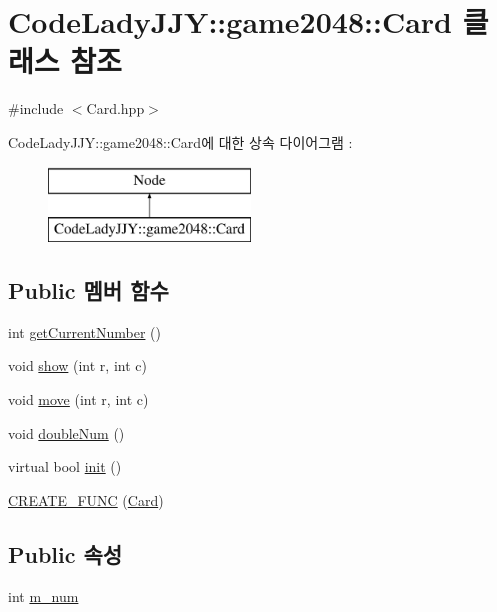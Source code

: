 \hypertarget{class_code_lady_j_j_y_1_1game2048_1_1_card}{}\section{Code\+Lady\+J\+JY\+:\+:game2048\+:\+:Card 클래스 참조}
\label{class_code_lady_j_j_y_1_1game2048_1_1_card}


{\ttfamily \#include $<$Card.\+hpp$>$}

Code\+Lady\+J\+JY\+:\+:game2048\+:\+:Card에 대한 상속 다이어그램 \+: \begin{figure}[H]
\begin{center}
\leavevmode
\includegraphics[height=2.000000cm]{class_code_lady_j_j_y_1_1game2048_1_1_card}
\end{center}
\end{figure}
\subsection*{Public 멤버 함수}
\begin{DoxyCompactItemize}
\item 
int \hyperlink{class_code_lady_j_j_y_1_1game2048_1_1_card_a7c8da9286db22bb16cfa0f8502b41eb4}{get\+Current\+Number} ()
\item 
void \hyperlink{class_code_lady_j_j_y_1_1game2048_1_1_card_abd3f3208867d1450ba4eeef3cef62d3f}{show} (int r, int c)
\item 
void \hyperlink{class_code_lady_j_j_y_1_1game2048_1_1_card_a6ad341b10626a9cc1aafe8229fa61ea6}{move} (int r, int c)
\item 
void \hyperlink{class_code_lady_j_j_y_1_1game2048_1_1_card_ad4cae75359815f3d80db488df3fd3dfd}{double\+Num} ()
\item 
virtual bool \hyperlink{class_code_lady_j_j_y_1_1game2048_1_1_card_a5efe85fbf1117b9a64cc13311352284c}{init} ()
\item 
\hyperlink{class_code_lady_j_j_y_1_1game2048_1_1_card_aeef08b192f5d93d6852ebfb75bb9bd9a}{C\+R\+E\+A\+T\+E\+\_\+\+F\+U\+NC} (\hyperlink{class_code_lady_j_j_y_1_1game2048_1_1_card}{Card})
\end{DoxyCompactItemize}
\subsection*{Public 속성}
\begin{DoxyCompactItemize}
\item 
int \hyperlink{class_code_lady_j_j_y_1_1game2048_1_1_card_ae612aaa37e50cb81d6f8ddb7283ebcbc}{m\+\_\+num}
\end{DoxyCompactItemize}


